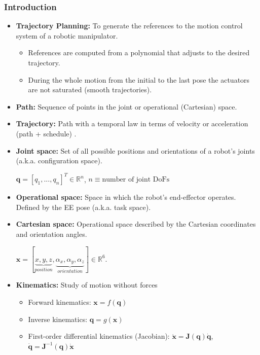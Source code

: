 \documentclass[10pt, aspectratio=169]{beamer}
\theoremstyle{remark}
\theoremstyle{definition}
\begin{document}
\begin{frame}[allowframebreaks]
\frametitle{Introduction}
	\begin{itemize}
    
	    \item \textbf{Trajectory Planning:} To generate the references to the motion control system of a robotic manipulator.
        \begin{itemize}
            \item References are computed from a polynomial that adjusts to the desired trajectory.
            \item During the whole motion from the initial to the last pose the actuators are not saturated (smooth trajectories).
        \end{itemize}
        
    \item \textbf{Path:} Sequence of points in the joint or operational (Cartesian) space. 
    
    \item \textbf{Trajectory:} Path with a temporal law in terms of velocity or acceleration (path + schedule) \cite{paths_and_trajectories}.
    
    \item \textbf{Joint space:} Set of all possible positions and orientations of a robot's joints (a.k.a. configuration space).
    
    $\mathbf{q} = [q_1, ..., q_n ]^T \in \mathbb{R}^n$, $n \equiv \textrm{number of joint DoFs}$ 

    \framebreak
    
    \item \textbf{Operational space:} Space in which the robot's end-effector operates. Defined by the EE pose (a.k.a. task space).

    \item \textbf{Cartesian space:} Operational space described by the Cartesian coordinates and orientation angles.
    
    $\mathbf{x} = [\underbrace{x, y, z}_{position}, \underbrace{\alpha_x, \alpha_y, \alpha_z}_{orientation}] \in \mathbb{R}^6$.

    \item \textbf{Kinematics:} Study of motion without forces

    \begin{itemize}
        \item Forward kinematics: $\mathbf{x} = f(\mathbf{q})$
        \item Inverse kinematics: $\mathbf{q} = g(\mathbf{x})$
        \item First-order differential kinematics (Jacobian): $\mathbf{\dot{x}} = \mathbf{J}(\mathbf{q})\mathbf{\dot{q}}$, \hspace{0.2cm} $\mathbf{\dot{q}} = \mathbf{J}^{-1}(\mathbf{q})\mathbf{\dot{x}}$
    \end{itemize}
    

\end{itemize}
\end{frame}
\end{document}
